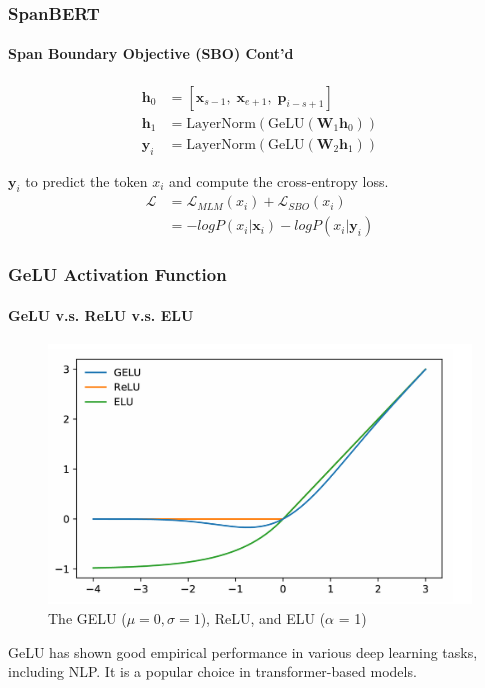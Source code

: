 \documentclass[12pt]{beamer}
\begin{document}
	\begin{frame}
		\frametitle{SpanBERT}
		\framesubtitle{Span Boundary Objective (SBO) Cont'd}
			
		\begin{equation*}
			\begin{split}
				\textbf{h}_{0} & = [ \mathbf{\textbf{x}}_{s-1}, \; \mathbf{\textbf{x}}_{e+1}, \; \mathbf{\textbf{p}}_{i-s+1} ] \\
				\textbf{h}_{1} & = \text{LayerNorm}( \text{GeLU}( \textbf{W}_{1} \textbf{h}_{0} )) \\
				\mathbf{y}_{i} & = \text{LayerNorm}( \text{GeLU}( \textbf{W}_{2} \textbf{h}_{1} ))
			\end{split}
		\end{equation*}
		
		 $\mathbf{y}_{i}$ to predict the token $x_{i}$ and compute the cross-entropy loss.
		 \begin{equation*}
		 	\begin{split}
		 		\mathcal{L} & = \mathcal{L}_{MLM}(x_i) + \mathcal{L}_{SBO}(x_i) \\
		 		& = - log P(x_i | \mathbf{\textbf{x}}_i) - log P(x_i | \mathbf{y}_i)
		 	\end{split}
		 \end{equation*}
		
	\end{frame}

        \begin{frame}
            \frametitle{GeLU Activation Function}
            \framesubtitle{GeLU v.s. ReLU v.s. ELU}

            \begin{figure}
			\centering
			\includegraphics[width=.65\textwidth]{gelu.png}
                \caption{The GELU ($\mu = 0, \sigma = 1$), ReLU, and ELU ($\alpha$ = 1)}
		\end{figure}

            GeLU has shown good empirical performance in various deep learning tasks, including NLP. It is a popular choice in transformer-based models.
            
        \end{frame}
 
\end{document}
